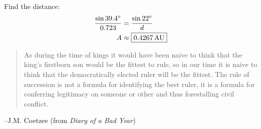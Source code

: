 \documentclass{exam}
\newcommand{\dg}{\ensuremath{^\circ}}
\begin{document}
\begin{description}
        Find the distance:
        \begin{align*}
          \frac{\sin 39.4 \dg}{0.723} & = \frac{\sin 22 \dg}{d} \\
          A                     & \approx \boxed{ \unit[0.4267]{AU} } \\
        \end{align*}

    \end{description}

  \else
    \vspace{1 cm}
    \begin{quote}
      \begin{em}
        As during the time of kings it would have been naive to think that the king’s firstborn son would be the fittest to
        rule, so in our time it is naive to think that the democratically elected ruler will be the fittest. The rule of
        succession is not a formula for identifying the best ruler, it is a formula for conferring legitimacy on someone or
        other and thus forestalling civil conflict.
      \end{em}
    \end{quote}
    \hspace{1.5 cm} --J.M. Coetzee (from {\em Diary of a Bad Year})
  \fi
\end{document}
